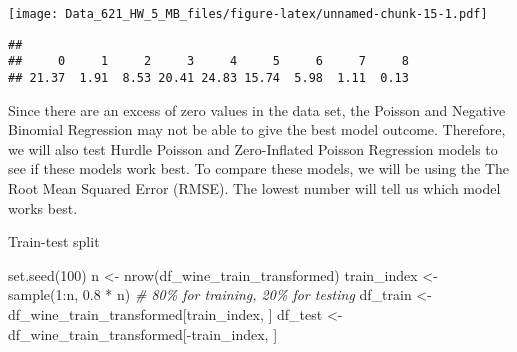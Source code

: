 \documentclass[
]{article}
\newenvironment{Shaded}{\begin{snugshade}}{\end{snugshade}}
\newcommand{\CommentTok}[1]{\textcolor[rgb]{0.56,0.35,0.01}{\textit{#1}}}
\newcommand{\DecValTok}[1]{\textcolor[rgb]{0.00,0.00,0.81}{#1}}
\newcommand{\FloatTok}[1]{\textcolor[rgb]{0.00,0.00,0.81}{#1}}
\newcommand{\FunctionTok}[1]{\textcolor[rgb]{0.00,0.00,0.00}{#1}}
\newcommand{\NormalTok}[1]{#1}
\newcommand{\OtherTok}[1]{\textcolor[rgb]{0.56,0.35,0.01}{#1}}
\newcommand{\SpecialCharTok}[1]{\textcolor[rgb]{0.00,0.00,0.00}{#1}}
\begin{document}
\texttt{[image: Data\_621\_HW\_5\_MB\_files/figure-latex/unnamed-chunk-15-1.pdf]}

\begin{Shaded}
\end{Shaded}

\begin{verbatim}
## 
##     0     1     2     3     4     5     6     7     8 
## 21.37  1.91  8.53 20.41 24.83 15.74  5.98  1.11  0.13
\end{verbatim}

Since there are an excess of zero values in the data set, the Poisson
and Negative Binomial Regression may not be able to give the best model
outcome. Therefore, we will also test Hurdle Poisson and Zero-Inflated
Poisson Regression models to see if these models work best. To compare
these models, we will be using the The Root Mean Squared Error (RMSE).
The lowest number will tell us which model works best.

Train-test split

\begin{Shaded}
\begin{Highlighting}[]
\FunctionTok{set.seed}\NormalTok{(}\DecValTok{100}\NormalTok{)  }
\NormalTok{n }\OtherTok{\textless{}{-}} \FunctionTok{nrow}\NormalTok{(df\_wine\_train\_transformed)}
\NormalTok{train\_index }\OtherTok{\textless{}{-}} \FunctionTok{sample}\NormalTok{(}\DecValTok{1}\SpecialCharTok{:}\NormalTok{n, }\FloatTok{0.8} \SpecialCharTok{*}\NormalTok{ n)  }\CommentTok{\# 80\% for training, 20\% for testing}
\NormalTok{df\_train }\OtherTok{\textless{}{-}}\NormalTok{ df\_wine\_train\_transformed[train\_index, ]}
\NormalTok{df\_test }\OtherTok{\textless{}{-}}\NormalTok{ df\_wine\_train\_transformed[}\SpecialCharTok{{-}}\NormalTok{train\_index, ]}
\end{Highlighting}
\end{Shaded}
\end{document}
